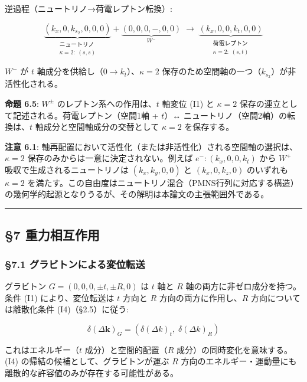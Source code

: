\documentclass[
  a4paper,11pt]{ltjsarticle}
\theoremstyle{definition}
\theoremstyle{remark}
\begin{document}
逆過程（ニュートリノ→荷電レプトン転換）:

\[\underbrace{(k_x, 0, k_{s_2}, 0, 0, 0)}_{\substack{\text{ニュートリノ} \\ \kappa = 2:\; (s, s)}} + \underbrace{(0, 0, 0, -, 0, 0)}_{W^-} \;\longrightarrow\; \underbrace{(k_x, 0, 0, k_t, 0, 0)}_{\substack{\text{荷電レプトン} \\ \kappa = 2:\; (s, t)}}\]

\(W^-\) が \(t\) 軸成分を供給し（\(0 \to k_t\)）、\(\kappa = 2\)
保存のため空間軸の一つ（\(k_{s_2}\)）が非活性化される。

\textbf{命題 6.5}: \(W^{\pm}\) のレプトン系への作用は、\(t\) 軸変位 (I1)
と \(\kappa = 2\) 保存の連立として記述される。荷電レプトン（空間1軸 +
\(t\)）↔ ニュートリノ（空間2軸）の転換は、\(t\)
軸成分と空間軸成分の交替として \(\kappa = 2\) を保存する。

\textbf{注意 6.1}:
軸再配置において活性化（または非活性化）される空間軸の選択は、\(\kappa = 2\)
保存のみからは一意に決定されない。例えば \(e^-: (k_x, 0, 0, k_t)\) から
\(W^+\) 吸収で生成されるニュートリノは \((k_x, k_y, 0, 0)\) と
\((k_x, 0, k_z, 0)\) のいずれも \(\kappa = 2\)
を満たす。この自由度はニュートリノ混合（PMNS行列に対応する構造）の幾何学的起源となりうるが、その解明は本論文の主張範囲外である。

\begin{center}\rule{0.5\linewidth}{0.5pt}\end{center}

\subsection{§7 重力相互作用}\label{ux91cdux529bux76f8ux4e92ux4f5cux7528}

\subsubsection{§7.1
グラビトンによる変位転送}\label{ux30b0ux30e9ux30d3ux30c8ux30f3ux306bux3088ux308bux5909ux4f4dux8ee2ux9001}

グラビトン \(G = (0, 0, 0, \pm t, \pm R, 0)\) は \(t\) 軸と \(R\)
軸の両方に非ゼロ成分を持つ。条件 (I1) により、変位転送は \(t\) 方向と
\(R\) 方向の両方に作用し、\(R\) 方向については離散化条件
(I4)（§2.5）に従う:

\[\delta(\Delta\mathbf{k})_G = (\delta(\Delta k)_t,\; \delta(\Delta k)_R)\]

これはエネルギー（\(t\) 成分）と空間的配置（\(R\)
成分）の同時変化を意味する。(I4) の帰結の候補として、グラビトンが運ぶ
\(R\)
方向のエネルギー・運動量にも離散的な許容値のみが存在する可能性がある。
\end{document}

